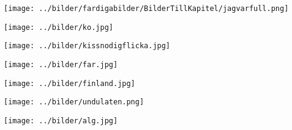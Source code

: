 \begin{intersong}
\sffamily\bfseries\LARGE{}
\begin{center}
\texttt{[image: ../bilder/fardigabilder/BilderTillKapitel/jagvarfull.png]} 
\end{center}
\end{intersong}
\sclearpage

\begin{intersong}
\begin{center}
\texttt{[image: ../bilder/ko.jpg]} 
\end{center}
\end{intersong}
\sclearpage


\sclearpage

\sclearpage
%
\sclearpage

\begin{intersong}
\begin{center}
\texttt{[image: ../bilder/kissnodigflicka.jpg]} 
\end{center}
\end{intersong}
\sclearpage

\begin{intersong}
\begin{center}
\texttt{[image: ../bilder/far.jpg]} 
\end{center}
\end{intersong}
\sclearpage


\sclearpage

\sclearpage

\begin{intersong}
\begin{center}
\texttt{[image: ../bilder/finland.jpg]} 
\end{center}
\end{intersong}
\sclearpage

\sclearpage

\sclearpage

\begin{intersong}
\begin{center}
\texttt{[image: ../bilder/undulaten.png]} 
\end{center}
\end{intersong}
\sclearpage

\sclearpage

\sclearpage



\begin{intersong}
\begin{center}
\texttt{[image: ../bilder/alg.jpg]} 
\end{center}
\end{intersong}
\sclearpage


\sclearpage

\sclearpage

\sclearpage

\sclearpage


%
\sclearpage
